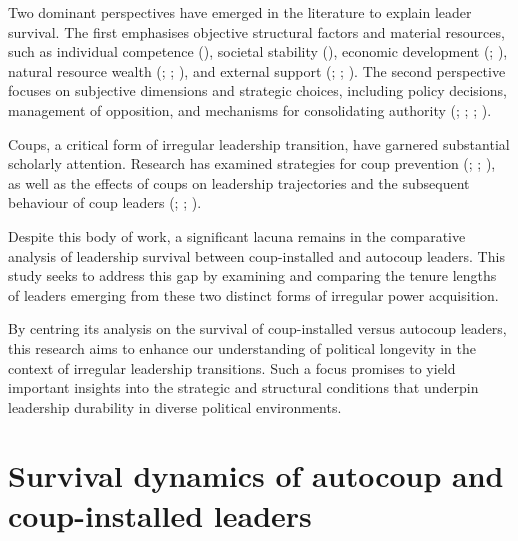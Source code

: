 \documentclass[
  12pt,
]{report}
\begin{document}
Two dominant perspectives have emerged in the literature to explain
leader survival. The first emphasises objective structural factors and
material resources, such as individual competence
(), societal stability
(), economic development
(;
), natural resource wealth
(;
;
), and
external support (;
; ). The second perspective focuses on subjective
dimensions and strategic choices, including policy decisions, management
of opposition, and mechanisms for consolidating authority
(;
;
;
).

Coups, a critical form of irregular leadership transition, have garnered
substantial scholarly attention. Research has examined strategies for
coup prevention (;
; ), as well as the effects of coups on leadership trajectories
and the subsequent behaviour of coup leaders
(;
;
).

Despite this body of work, a significant lacuna remains in the
comparative analysis of leadership survival between coup-installed and
autocoup leaders. This study seeks to address this gap by examining and
comparing the tenure lengths of leaders emerging from these two distinct
forms of irregular power acquisition.

By centring its analysis on the survival of coup-installed versus
autocoup leaders, this research aims to enhance our understanding of
political longevity in the context of irregular leadership transitions.
Such a focus promises to yield important insights into the strategic and
structural conditions that underpin leadership durability in diverse
political environments.

\section{Survival dynamics of autocoup and coup-installed
leaders}\label{survival-dynamics-of-autocoup-and-coup-installed-leaders}
\end{document}
